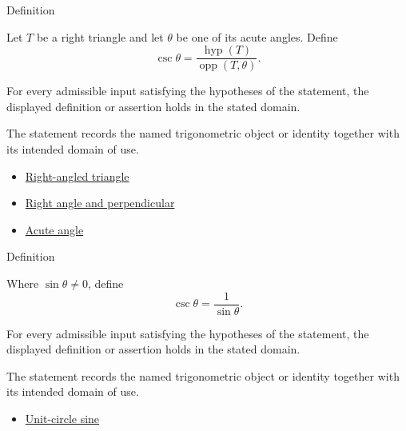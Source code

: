 

\begin{definitionbox}{Definition}
\begin{definition}
\label{def:right-triangle-cosecant}
Let $T$ be a right triangle and let $\theta$ be one of its acute angles. Define
\[
\csc\theta=\frac{\operatorname{hyp}(T)}{\operatorname{opp}(T,\theta)}.
\]
\end{definition}
\end{definitionbox}
\begin{remark*}
For every admissible input satisfying the hypotheses of the statement, the
displayed definition or assertion holds in the stated domain.
\end{remark*}

\begin{remark*}[Interpretation]
The statement records the named trigonometric object or identity together with
its intended domain of use.
\end{remark*}

\begin{dependencies}
\begin{itemize}
  \item \hyperref[def:euclid-triangle-angle-classes]{Right-angled triangle}
  \item \hyperref[def:euclid-right-angle-and-perpendicular]{Right angle and perpendicular}
  \item \hyperref[def:euclid-acute-angle]{Acute angle}
\end{itemize}
\end{dependencies}



\begin{definitionbox}{Definition}
\begin{definition}
\label{def:extended-cosecant}
Where $\sin\theta\neq 0$, define
\[
  \csc\theta=\frac{1}{\sin\theta}.
\]
\end{definition}
\end{definitionbox}
\begin{remark*}
For every admissible input satisfying the hypotheses of the statement, the
displayed definition or assertion holds in the stated domain.
\end{remark*}

\begin{remark*}[Interpretation]
The statement records the named trigonometric object or identity together with
its intended domain of use.
\end{remark*}

\begin{dependencies}
\begin{itemize}
  \item \hyperref[def:unit-circle-sine]{Unit-circle sine}
\end{itemize}
\end{dependencies}
